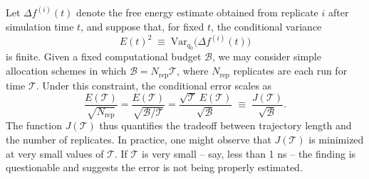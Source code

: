 Let $\Delta f^{(i)}(t)$ denote the free energy estimate obtained from replicate $i$ after simulation time $t$, and suppose that, for fixed $t$, the conditional variance 
\[
E(t)^2 \;\equiv\; \mathrm{Var}_{q_0}\!\bigl(\Delta f^{(i)}(t)\bigr)
\]
is finite. Given a fixed computational budget $\mathcal{B}$, we may consider simple allocation schemes in which $\mathcal{B} = N_{\mathrm{rep}}\mathcal{T}$, where $N_{\mathrm{rep}}$ replicates are each run for time $\mathcal{T}$. Under this constraint, the conditional error scales as
\[
\frac{E(\mathcal{T})}{\sqrt{N_{\mathrm{rep}}}}
= \frac{E(\mathcal{T})}{\sqrt{\mathcal{B}/\mathcal{T}}}
= \frac{\sqrt{\mathcal{T}}\,E(\mathcal{T})}{\sqrt{\mathcal{B}}}
\;\equiv\; \frac{J(\mathcal{T})}{\sqrt{\mathcal{B}}}.
\]
The function $J(\mathcal{T})$ thus quantifies the tradeoff between trajectory length and the number of replicates. In practice, one might observe that $J(\mathcal{T})$ is minimized at very small values of $\mathcal{T}$. If $\mathcal{T}$ is very small -- say, less than 1 ns -- the finding is questionable and suggests the error is not being properly estimated. 






